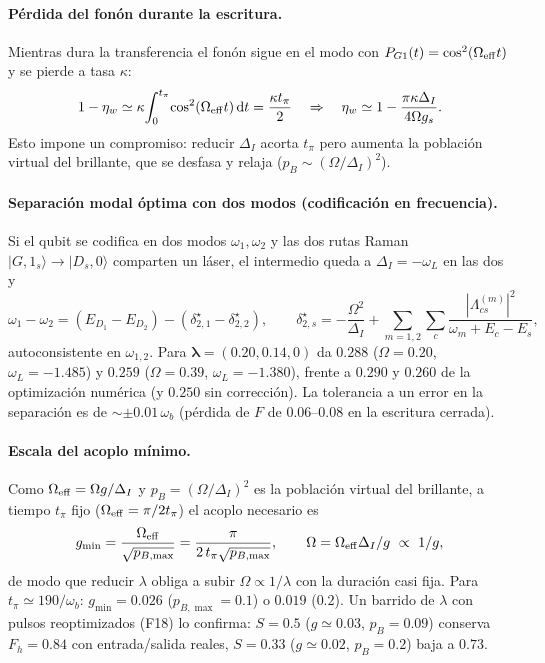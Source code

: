 \documentclass[11pt,a4paper]{article}
\newcommand{\wb}{\omega_b}
\begin{document}
\paragraph{Pérdida del fonón durante la escritura.}
Mientras dura la transferencia el fonón sigue en el modo con $P_{G1}(t)=\cos^2(\Omega_{\rm eff}t)$ y se pierde a tasa $\kappa$:
\begin{equation}
1-\eta_w\simeq\kappa\!\int_0^{t_\pi}\!\cos^2(\Omega_{\rm eff}t)\,\mathrm{d}t=\frac{\kappa t_\pi}{2}
\quad\Rightarrow\quad \eta_w\simeq1-\frac{\pi\kappa\Delta_I}{4\Omega g_s}. \label{eq:etaw}
\end{equation}
Esto impone un compromiso: reducir $\Delta_I$ acorta $t_\pi$ pero aumenta la población virtual del brillante, que se desfasa y relaja ($p_B\sim(\Omega/\Delta_I)^2$).

\paragraph{Separación modal óptima con dos modos (codificación en frecuencia).}
Si el qubit se codifica en dos modos $\omega_1,\omega_2$ y las dos rutas Raman $|G,1_s\rangle\to|D_s,0\rangle$ comparten un láser, el intermedio queda a $\Delta_I=-\omega_L$ en las dos y
\begin{equation}
\omega_1-\omega_2=(E_{D_1}-E_{D_2})-(\delta^\star_{2,1}-\delta^\star_{2,2}),\qquad
\delta^\star_{2,s}=-\frac{\Omega^2}{\Delta_I}+\sum_{m=1,2}\sum_{c}\frac{|\Lambda^{(m)}_{cs}|^2}{\omega_m+E_c-E_s},
\end{equation}
autoconsistente en $\omega_{1,2}$. Para $\bm\lambda=(0.20,0.14,0)$ da $0.288$ ($\Omega=0.20$, $\omega_L=-1.485$) y $0.259$ ($\Omega=0.39$, $\omega_L=-1.380$), frente a $0.290$ y $0.260$ de la optimización numérica (y $0.250$ sin corrección).
La tolerancia a un error en la separación es de $\sim\pm0.01\,\wb$ (pérdida de $F$ de $0.06$--$0.08$ en la escritura cerrada).

\paragraph{Escala del acoplo mínimo.}
Como $\Omega_{\rm eff}=\Omega g/\Delta_I$ y $p_B=(\Omega/\Delta_I)^2$ es la población virtual del brillante, a tiempo $t_\pi$ fijo ($\Omega_{\rm eff}=\pi/2t_\pi$) el acoplo necesario es
\begin{equation}
g_{\min}=\frac{\Omega_{\rm eff}}{\sqrt{p_{B,\max}}}=\frac{\pi}{2\,t_\pi\sqrt{p_{B,\max}}},\qquad \Omega=\Omega_{\rm eff}\Delta_I/g\ \propto\ 1/g,
\label{eq:gmin}
\end{equation}
de modo que reducir $\lambda$ obliga a subir $\Omega\propto1/\lambda$ con la duración casi fija. Para $t_\pi\simeq190/\wb$: $g_{\min}=0.026$ ($p_{B,\max}=0.1$) o $0.019$ ($0.2$).
Un barrido de $\lambda$ con pulsos reoptimizados (F18) lo confirma: $S=0.5$ ($g\simeq0.03$, $p_B=0.09$) conserva $F_h=0.84$ con entrada/salida reales, $S=0.33$ ($g\simeq0.02$, $p_B=0.2$) baja a $0.73$.
\end{document}
